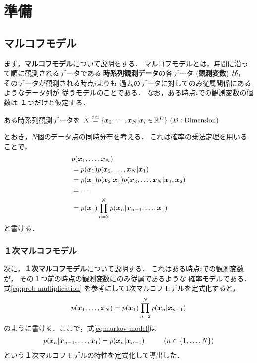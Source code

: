 \section{準備}
\label{sec:prepare}
\subsection{マルコフモデル}
\label{sec:prepare:markov-model}
まず，\textbf{マルコフモデル}について説明をする．
マルコフモデルとは，時間に沿って順に観測されるデータである
\textbf{時系列観測データ}の各データ (\textbf{観測変数}) が，
そのデータが観測される時点$i$よりも
過去のデータに対してのみ従属関係にあるようなデータ列が
従うモデルのことである．
なお，ある時点$i$での観測変数の個数は
１つだけと仮定する．

ある時系列観測データを
$X \overset{\mathrm{def}}{=} \{\mbox{\boldmath $x$}_1, \dots, \mbox{\boldmath $x$}_N|\mbox{\boldmath $x$}_i \in \mathbb{R}^D\}\ (D:\text{Dimension})$

とおき，$N$個のデータ点の同時分布を考える．
これは確率の乗法定理を用いることで，
\begin{align}
    & p(\mbox{\boldmath $x$}_1, \dots, \mbox{\boldmath $x$}_N) \\
    & = p(\mbox{\boldmath $x$}_1)p(\mbox{\boldmath $x$}_2, \dots, \mbox{\boldmath $x$}_N| \mbox{\boldmath $x$}_1) \\
    & = p(\mbox{\boldmath $x$}_1)p(\mbox{\boldmath $x$}_2| \mbox{\boldmath $x$}_1)p(\mbox{\boldmath $x$}_3, \dots, \mbox{\boldmath $x$}_N| \mbox{\boldmath $x$}_1, \mbox{\boldmath $x$}_2) \\
    & = \dots \\
    & = p(\mbox{\boldmath $x$}_1)\prod_{n=2}^{N}p(\mbox{\boldmath $x$}_n| \mbox{\boldmath $x$}_{n-1}, \dots, \mbox{\boldmath $x$}_1) \label{eq:prob-multiplication}\\
\end{align}
と書ける．%

\subsubsection{１次マルコフモデル}
\label{sec:prepare:first-order-markov-model}
次に，\textbf{１次マルコフモデル}について説明する．
これはある時点$i$での観測変数が，
その１つ前の時点の観測変数にのみ従属であるような
確率モデルである．式\eqref{eq:prob-multiplication}
を参考にして1次マルコフモデルを定式化すると，
\begin{align}
  & p(\mbox{\boldmath $x$}_1, \dots, \mbox{\boldmath $x$}_N) = p(\mbox{\boldmath $x$}_1)\prod_{n=2}^{N}p(\mbox{\boldmath $x$}_n|\mbox{\boldmath $x$}_{n-1}) \label{eq:markov-model}\\
\end{align}
のように書ける．ここで，式\eqref{eq:markov-model}は
\begin{align}
  p(\bvec{x}_n| \bvec{x}_{n-1}, \dots, \bvec{x}_1) = p(\bvec{x}_n| \bvec{x}_{n-1})\hspace{10mm}(n\in \{1,\dots,N\})
\end{align}
という１次マルコフモデルの特性を定式化して導出した．

